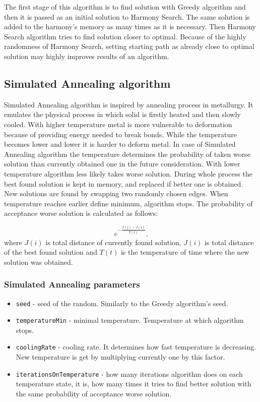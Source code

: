\documentclass[titlepage]{article}
\begin{document}
The first stage of this algorithm is to find solution with Greedy algorithm and then it is passed as an initial solution to Harmony Search. The same solution is added to the harmony's memory as many times as it is necessary. Then Harmony Search algorithm tries to find solution closer to optimal. Because of the highly randomness of Harmony Search, setting starting path as already close to optimal solution may highly improves results of an algorithm.

\subsection{Simulated Annealing algorithm}

Simulated Annealing algorithm is inspired by annealing process in metallurgy. It emulates the physical process in which solid is firstly heated and then slowly cooled. With higher temperature metal is more vulnerable to deformation because of providing energy needed to break bonds. While the temperature becomes lower and lower it is harder to deform metal. In case of Simulated Annealing algorithm the temperature determines the probability of taken worse solution than currently obtained one in the future consideration. With lower temperature algorithm less likely takes worse solution. During whole process the best found solution is kept in memory, and replaced if better one is obtained. New solutions are found by swapping two randomly chosen edges. When temperature reaches earlier define minimum, algorithm stops. The probability of acceptance worse solution is calculated as follows:

\[e^{-\frac{J(j)-J(i)}{T(t)}}\mbox{,}\]
	where $J(i)$ is total distance of currently found solution, $J(i)$ is total distance of the best found solution and $T(t)$ is the temperature of time where the new solution was obtained.


\subsubsection{Simulated Annealing parameters}

\begin{itemize}
	\item \texttt{seed} - seed of the random. Similarly to the Greedy algorithm's seed.
	
	\item \texttt{temperatureMin} - minimal temperature. Temperature at which algorithm stops.
	
	\item \texttt{coolingRate} - cooling rate. It determines how fast temperature is decreasing. New temperature is get by multiplying currently one by this factor.
	
	\item \texttt{iterationsOnTemperature} - how many iterations algorithm does on each temperature state, it is, how many times it tries to find better solution with the same probability of acceptance worse solution.
\end{itemize}
\end{document}
